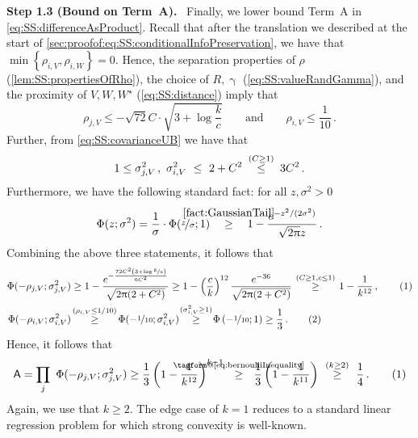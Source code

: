 \documentclass[11pt,letterpaper]{article}
\makeatletter
\theoremstyle{plain}
\theoremstyle{definition}
\theoremstyle{remark}
\newcommand{\yesnum}{\addtocounter{equation}{1}\tag{\theequation}}
\renewcommand{\eqref}[1]{\textup{\eqrefform@{\ref{#1}}}}
\let\eqrefform@\tagform@
\newcommand{\Stackrel}[2]{\stackrel{\mathmakebox[\widthof{\ensuremath{#2}}]{#1}}{#2}}
\newcommand{\qquadtext}[1]{\qquad\text{#1}\qquad}
\newcommand{\qquadand}{\qquadtext{and}}
\newcommand{\sinparen}[1]{\ensuremath{(#1)}}
\newcommand{\inbrace}[1]{\ensuremath{\left\{#1\right\}}}
\newcommand{\inparen}[1]{\ensuremath{\left(#1\right)}}
\newcommand{\sfrac}[2]{{#1/#2}}
\newcommand{\nfrac}[2]{\nicefrac{#1}{#2}}
\renewcommand{\paragraph}[1]{\medskip \noindent\textbf{#1}~}
\renewcommand{\gamma}{\upgamma}
\renewcommand{\pi}{\uppi}
\newcommand{\Wstar}{{W^\star}}
\newcommand{\customcdf}[2]{\Phi\sinparen{#1; \sigma_{#2}^2}}
\newcommand{\proofconstant}{{3}}
\makeatother
\begin{document}
{{    \paragraph{Step 1.3 (Bound on Term~\textsf{A}).}
        Finally, we lower bound Term~\textsf{A} in \cref{eq:SS:differenceAsProduct}.
        Recall that after the translation we described at the start of \cref{sec:proofof:eq:SS:conditionalInfoPreservation}, we have that $\min\inbrace{\rho_{i,V}, \rho_{i,W}}=0$.
        Hence, the separation properties of $\rho$ (\cref{lem:SS:propertiesOfRho}), 
        the choice of $R, \gamma$ (\cref{eq:SS:valueRandGamma}), 
        and the proximity of $V, W, \Wstar$ (\cref{eq:SS:distance}) imply that 
    \[
        \rho_{j,V}\leq 
        -{\sqrt{72}C}\cdot \sqrt{
            \proofconstant{} + \log{\frac{k}{c}}
        }
        \qquadand
        \rho_{i,V}  
        \leq \frac{1}{10}
        \,. 
    \]
    Further, from \cref{eq:SS:covarianceUB} we have that 
    \[
        1\leq \sigma_{j,V}^2\,,~ \sigma_{i,V}^2~\leq~ 2+C^2~~~\Stackrel{(C\geq 1)}{\leq}~~~ 3C^2\,.
    \]
    Furthermore, we have the following standard fact: for all $z,\sigma^2>0$
    \[
        \Phi(z;\sigma^2) 
        = 
            \frac{1}{\sigma}\cdot \Phi(\nfrac{z}{\sigma}; 1)
        \quad\Stackrel{\rm\cref{fact:GaussianTail}}{\geq}\quad 
            1 - \frac{e^{-z^2/(2\sigma^2)}}{\sqrt{2\pi}z}
        \,.
    \]
    Combining the above three statements, 
    it follows that 
    \begin{align*}
        \customcdf{-\rho_{j,V}}{j,V}
            &\geq   1 
                    - \frac{
                        e^{
                            -\frac{72C^2\inparen{3+\log{\nfrac{k}{c}}}}{6C^2}
                        }
                    }{\sqrt{2\pi(2+C^2)}}
            \geq 
                1 - \inparen{\frac{c}{k}}^{12} \frac{e^{-36}}{\sqrt{2\pi(2+C^2)}}
            ~~\quad\Stackrel{(C\geq 1,c\leq 1)}{\geq}\quad~~ 
                1 - {\frac{1}{k^{12}}}\,,
                \yesnum\label{eq:SS:infoPreservation:toReferenceLater1}\\
        \customcdf{-\rho_{i,V}}{i,V}&
            ~~\quad\Stackrel{(\rho_{i,V}\leq \sfrac{1}{10})}{\geq}\quad~~
            \customcdf{-\nfrac{1}{10}}{i,V}
            \quad\Stackrel{(\sigma_{i,V}^2\geq 1)}{\geq}\quad
            \Phi\inparen{-\nfrac{1}{10}; 1}
            \geq  \frac{1}{3}\,.
            \yesnum\label{eq:SS:infoPreservation:toReferenceLater2}
    \end{align*}
    Hence, it follows that 
    \[
        \textsf{A}
        = \prod_{j}~ \customcdf{-\rho_{j,V}}{j,V}
        \geq 
        \frac{1}{3} 
        \inparen{1 - \frac{1}{k^{12}}}^{k-1}
        ~~\Stackrel{\eqref{eq:bernouliiInequality}}{\geq}~~ 
        \frac{1}{3}\inparen{1 - \frac{1}{k^{11}}}
        \quad\Stackrel{(k\geq 2)}{\geq}\quad \frac{1}{4}\,.
        \yesnum\label{eq:SS:termA:final}
    \]
    Again, we use that $k\geq 2$.
    The edge case of $k=1$  reduces to a standard linear regression problem for which strong convexity is well-known.

}}
\end{document}
